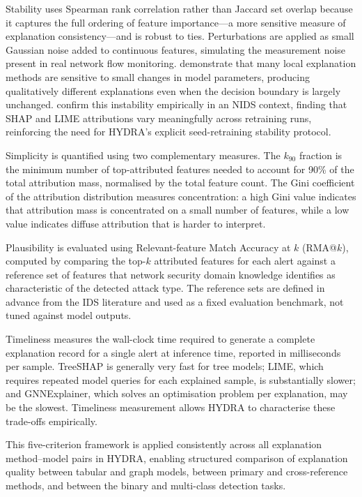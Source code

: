 \documentclass[12pt,a4paper]{report}
\begin{document}
Stability uses Spearman rank correlation rather than Jaccard set overlap because it captures the full ordering of feature importance---a more sensitive measure of explanation consistency---and is robust to ties. Perturbations are applied as small Gaussian noise added to continuous features, simulating the measurement noise present in real network flow monitoring. \citet{alvarez2018} demonstrate that many local explanation methods are sensitive to small changes in model parameters, producing qualitatively different explanations even when the decision boundary is largely unchanged. \citet{viirlaid2025} confirm this instability empirically in an NIDS context, finding that SHAP and LIME attributions vary meaningfully across retraining runs, reinforcing the need for HYDRA's explicit seed-retraining stability protocol.

Simplicity is quantified using two complementary measures. The $k_{90}$ fraction is the minimum number of top-attributed features needed to account for 90\% of the total attribution mass, normalised by the total feature count. The Gini coefficient of the attribution distribution measures concentration: a high Gini value indicates that attribution mass is concentrated on a small number of features, while a low value indicates diffuse attribution that is harder to interpret.

Plausibility is evaluated using Relevant-feature Match Accuracy at $k$ (RMA@$k$), computed by comparing the top-$k$ attributed features for each alert against a reference set of features that network security domain knowledge identifies as characteristic of the detected attack type. The reference sets are defined in advance from the IDS literature and used as a fixed evaluation benchmark, not tuned against model outputs.

Timeliness measures the wall-clock time required to generate a complete explanation record for a single alert at inference time, reported in milliseconds per sample. TreeSHAP is generally very fast for tree models; LIME, which requires repeated model queries for each explained sample, is substantially slower; and GNNExplainer, which solves an optimisation problem per explanation, may be the slowest. Timeliness measurement allows HYDRA to characterise these trade-offs empirically.

This five-criterion framework is applied consistently across all explanation method--model pairs in HYDRA, enabling structured comparison of explanation quality between tabular and graph models, between primary and cross-reference methods, and between the binary and multi-class detection tasks.
\end{document}
